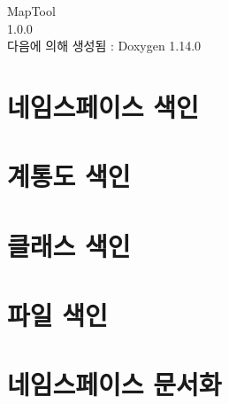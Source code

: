 \documentclass[twoside]{book}
\newcommand{\+}{\discretionary{\mbox{\scriptsize$\hookleftarrow$}}{}{}}
\newcommand{\clearemptydoublepage}{%
    \newpage{\pagestyle{empty}\cleardoublepage}%
  }
\begin{document}
  \raggedbottom
    \hypersetup{pageanchor=false,
                bookmarksnumbered=true,
                pdfencoding=unicode
               }
  \begin{titlepage}
  \vspace*{7cm}
  \begin{center}%
  {\Large Map\+Tool}\\
  [1ex]\large 1.\+0.\+0 \\
  \vspace*{1cm}
  {\large 다음에 의해 생성됨 \+:  Doxygen 1.14.0}\\
  \end{center}
  \end{titlepage}
  \clearemptydoublepage
  \tableofcontents
  \clearemptydoublepage
  \hypersetup{pageanchor=true}
\chapter{네임스페이스 색인}

\chapter{계통도 색인}

\chapter{클래스 색인}

\chapter{파일 색인}

\chapter{네임스페이스 문서화}

\end{document}
